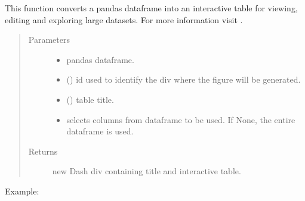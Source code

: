 \documentclass[letterpaper,10pt,english]{sphinxmanual}
\begin{document}
\begin{fulllineitems}
\label{\detokenize{_autosummary/analytics_core.viz:analytics_core.viz.viz.get_table}}
This function converts a pandas dataframe into an interactive table for viewing, editing and exploring large datasets. For more information visit .
\begin{quote}\begin{description}
\item[{Parameters}] \leavevmode\begin{itemize}
\item {} 
 \textendash{} pandas dataframe.

\item {} 
 () \textendash{} id used to identify the div where the figure will be generated.

\item {} 
 () \textendash{} table title.

\item {} 
 \textendash{} selects columns from dataframe to be used. If None, the entire dataframe is used.

\end{itemize}

\item[{Returns}] \leavevmode
new Dash div containing title and interactive table.

\end{description}\end{quote}

Example:

\begin{sphinxVerbatim}[commandchars=\\\{\}]
       
\end{sphinxVerbatim}

\end{fulllineitems}
\end{document}
